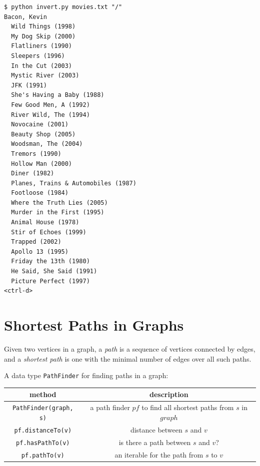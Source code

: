 \documentclass[8pt,a4paper,compress,handout]{beamer}
\begin{document}
\begin{frame}[fragile]
\begin{lstlisting}[language={}]
$ python invert.py movies.txt "/"
Bacon, Kevin
  Wild Things (1998)
  My Dog Skip (2000)
  Flatliners (1990)
  Sleepers (1996)
  In the Cut (2003)
  Mystic River (2003)
  JFK (1991)
  She's Having a Baby (1988)
  Few Good Men, A (1992)
  River Wild, The (1994)
  Novocaine (2001)
  Beauty Shop (2005)
  Woodsman, The (2004)
  Tremors (1990)
  Hollow Man (2000)
  Diner (1982)
  Planes, Trains & Automobiles (1987)
  Footloose (1984)
  Where the Truth Lies (2005)
  Murder in the First (1995)
  Animal House (1978)
  Stir of Echoes (1999)
  Trapped (2002)
  Apollo 13 (1995)
  Friday the 13th (1980)
  He Said, She Said (1991)
  Picture Perfect (1997)
<ctrl-d>
\end{lstlisting}
\end{frame}

\section{Shortest Paths in Graphs}
\begin{frame}[fragile]
Given two vertices in a graph, a \emph{path} is a sequence of vertices connected by edges, and a \emph{shortest path} is one with the minimal number of edges over all such paths. 

\bigskip

A data type \lstinline{PathFinder} for finding paths in a graph:
\begin{center}
\begin{tabular}{cc}
method & description \\ \hline
\lstinline$PathFinder(graph, s)$ & a path finder $pf$ to find all shortest paths from $s$ in $graph$ \\
\lstinline$pf.distanceTo(v)$ & distance between $s$ and $v$ \\
\lstinline$pf.hasPathTo(v)$ & is there a path between $s$ and $v$? \\
\lstinline$pf.pathTo(v)$ & an iterable for the path from $s$ to $v$
\end{tabular} 
\end{center}
\end{frame}
\end{document}
